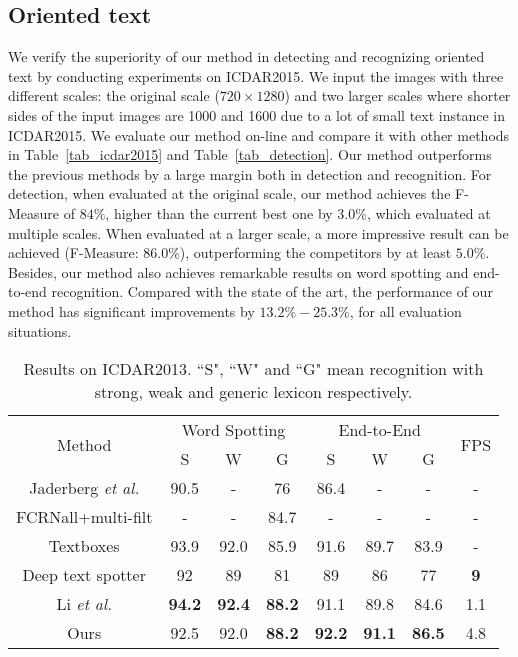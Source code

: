 \documentclass[runningheads]{llncs}
\begin{document}
\subsection{Oriented text}
We verify the superiority of our method in detecting and recognizing oriented text by conducting experiments on ICDAR2015. We input the images with three different scales: the original scale ($720 \times 1280$) and two larger scales where shorter sides of the input images are 1000 and 1600 due to a lot of small text instance in ICDAR2015.  We evaluate our method on-line and compare it  with other methods in Table~\ref{tab_icdar2015} and Table~\ref{tab_detection}. Our method outperforms the previous methods by a large margin both in detection and recognition. For detection, when evaluated at the original scale, our method achieves the F-Measure of $84\%$, higher than the current best one \cite{he2017deep}  by $3.0\%$, which evaluated at multiple scales. When evaluated at a larger scale, a more impressive result can be achieved (F-Measure: $86.0\%$), outperforming the competitors by at least $5.0\%$. Besides, our method also achieves remarkable results on word spotting and end-to-end recognition. Compared with the state of the art, the performance of our method has significant improvements by $13.2\%-25.3\%$, for all evaluation situations.
\begin{table}[ht]
\begin{centering}
\caption{Results on ICDAR2013. ``S", ``W" and ``G" mean recognition with strong, weak and generic lexicon respectively.}
\label{tab_icdar2013}
\begin{tabular}{|c|c|c|c|c|c|c|c|}
\hline 
\multirow{2}{*}{Method} & \multicolumn{3}{c|}{Word Spotting} & \multicolumn{3}{c|}{End-to-End} & \multirow{2}{*}{FPS}\tabularnewline
\cline{2-7} 
 & S & W & G & S & W & G & \tabularnewline
\hline 
\hline
Jaderberg \emph{et al.} \cite{jaderberg2016reading} & 90.5  & - & 76 & 86.4 & - & - & - \tabularnewline
\hline 
 FCRNall+multi-filt \cite{SynthText} & - & - & 84.7 & - & - & - &  - \tabularnewline
 \hline 
Textboxes \cite{liao2017textboxes}  & 93.9  & 92.0  & 85.9 & 91.6 & 89.7 & 83.9 & - \tabularnewline
 \hline 
Deep text spotter \cite{Busta_2017_ICCV} & 92 & 89 & 81 & 89 & 86 & 77 & \textbf{9} \tabularnewline
\hline 
Li \emph{et al.} \cite{Li_2017_ICCV}  &\textbf{94.2} &\textbf{92.4} &\textbf{88.2} &91.1 &89.8 &84.6 & 1.1 \tabularnewline
\hline 
\hline
 Ours  &92.5 &92.0 &\textbf{88.2} &\textbf{92.2} &\textbf{91.1} &\textbf{86.5} &4.8   \tabularnewline
\hline
\end{tabular}
\par\end{centering}
\end{table}
\end{document}
